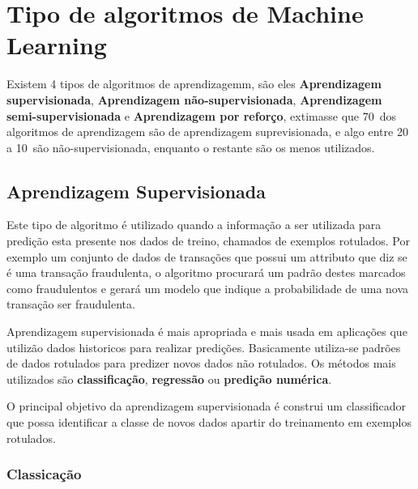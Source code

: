 \section{Tipo de algoritmos de Machine Learning}
\label{sec:ml-types}

Existem 4 tipos de algoritmos de aprendizagemm, são eles \textbf{Aprendizagem supervisionada}, \textbf{Aprendizagem não-supervisionada},
\textbf{Aprendizagem semi-supervisionada} e \textbf{Aprendizagem por reforço}, extimasse que 70\ dos algoritmos de aprendizagem são de 
aprendizagem suprevisionada, e algo entre 20 a 10\ são não-supervisionada, enquanto o restante são os menos utilizados.

\subsection{Aprendizagem Supervisionada}
\label{subsec:supervised-learning}
Este tipo de algoritmo é utilizado quando a informação a ser utilizada para predição esta presente nos dados de treino, chamados de 
exemplos rotulados. Por exemplo um conjunto de dados de transações que possui um attributo que diz se é uma transação fraudulenta, o 
algoritmo procurará um padrão destes marcados como fraudulentos e gerará um modelo que indique a probabilidade de uma nova transação 
ser fraudulenta.

Aprendizagem supervisionada é mais apropriada e mais usada em aplicações que utilizão dados historicos para realizar predições. 
Basicamente utiliza-se padrões de dados rotulados para predizer novos dados não rotulados. 
Os métodos mais utilizados são \textbf{classificação}, \textbf{regressão} ou \textbf{predição numérica}.

O principal objetivo da aprendizagem supervisionada é construi um classificador que possa identificar a classe de novos dados apartir
do treinamento em exemplos rotulados.     


\subsubsection{Classicação}
\label{subsubsec:classificacao}

